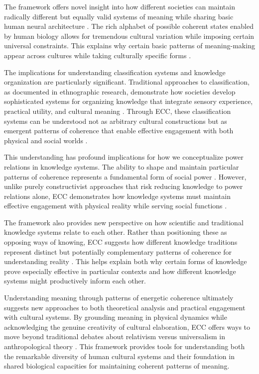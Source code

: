 The framework offers novel insight into how different societies can maintain radically different but equally valid systems of meaning while sharing basic human neural architecture \cite{merleau1962phenomenology}. The rich alphabet of possible coherent states enabled by human biology allows for tremendous cultural variation while imposing certain universal constraints. This explains why certain basic patterns of meaning-making appear across cultures while taking culturally specific forms \cite{throop2003articulating}.

The implications for understanding classification systems and knowledge organization are particularly significant. Traditional approaches to classification, as documented in ethnographic research, demonstrate how societies develop sophisticated systems for organizing knowledge that integrate sensory experience, practical utility, and cultural meaning \cite{ellen2016cultural}. Through ECC, these classification systems can be understood not as arbitrary cultural constructions but as emergent patterns of coherence that enable effective engagement with both physical and social worlds \cite{levi1966savage}.

This understanding has profound implications for how we conceptualize power relations in knowledge systems. The ability to shape and maintain particular patterns of coherence represents a fundamental form of social power \cite{foucault1980power}. However, unlike purely constructivist approaches that risk reducing knowledge to power relations alone, ECC demonstrates how knowledge systems must maintain effective engagement with physical reality while serving social functions \cite{scott1998seeing}.

The framework also provides new perspective on how scientific and traditional knowledge systems relate to each other. Rather than positioning these as opposing ways of knowing, ECC suggests how different knowledge traditions represent distinct but potentially complementary patterns of coherence for understanding reality \cite{latour1999pandora}. This helps explain both why certain forms of knowledge prove especially effective in particular contexts and how different knowledge systems might productively inform each other.

Understanding meaning through patterns of energetic coherence ultimately suggests new approaches to both theoretical analysis and practical engagement with cultural systems. By grounding meaning in physical dynamics while acknowledging the genuine creativity of cultural elaboration, ECC offers ways to move beyond traditional debates about relativism versus universalism in anthropological theory \cite{wolf1999envisioning}. This framework provides tools for understanding both the remarkable diversity of human cultural systems and their foundation in shared biological capacities for maintaining coherent patterns of meaning.
